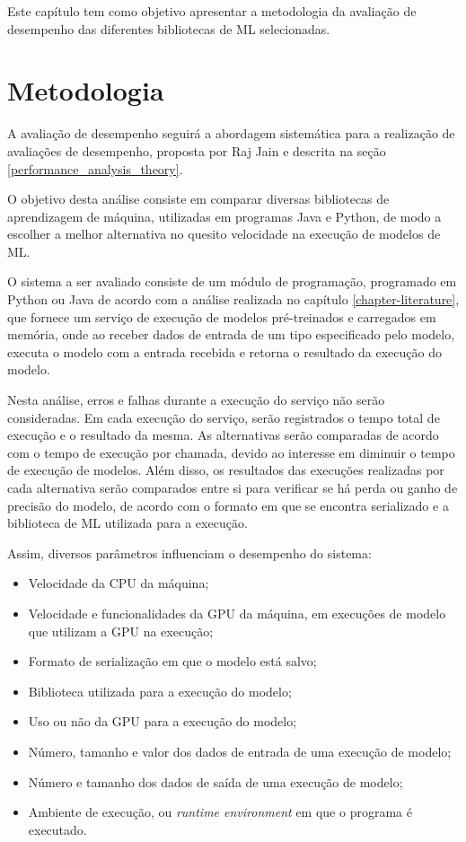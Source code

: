 Este capítulo tem como objetivo apresentar a metodologia da avaliação de desempenho das diferentes bibliotecas de ML selecionadas.

\section{Metodologia}

A avaliação de desempenho seguirá a abordagem sistemática para a realização de avaliações de desempenho, proposta por Raj Jain e descrita na seção \ref{performance_analysis_theory}.

O objetivo desta análise consiste em comparar diversas bibliotecas de aprendizagem de máquina, utilizadas em programas Java e Python, de modo a escolher a melhor alternativa no quesito velocidade na execução de modelos de ML.

O sistema a ser avaliado consiste de um módulo de programação, programado em Python ou Java de acordo com a análise realizada no capítulo \ref{chapter-literature}, que fornece um serviço de execução de modelos pré-treinados e carregados em memória, onde ao receber dados de entrada de um tipo especificado pelo modelo, executa o modelo com a entrada recebida e retorna o resultado da execução do modelo.

Nesta análise, erros e falhas durante a execução do serviço não serão consideradas. Em cada execução do serviço, serão registrados o tempo total de execução e o resultado da mesma. As alternativas serão comparadas de acordo com o tempo de execução por chamada, devido ao interesse em diminuir o tempo de execução de modelos. Além disso, os resultados das execuções realizadas por cada alternativa serão comparados entre si para verificar se há perda ou ganho de precisão do modelo, de acordo com o formato em que se encontra serializado e a biblioteca de ML utilizada para a execução.

Assim, diversos parâmetros influenciam o desempenho do sistema:

\begin{itemize}
  \item Velocidade da CPU da máquina;
  \item Velocidade e funcionalidades da GPU da máquina, em execuções de modelo que utilizam a GPU na execução;
  \item Formato de serialização em que o modelo está salvo;
  \item Biblioteca utilizada para a execução do modelo;
  \item Uso ou não da GPU para a execução do modelo;
  \item Número, tamanho e valor dos dados de entrada de uma execução de modelo;
  \item Número e tamanho dos dados de saída de uma execução de modelo;
  \item Ambiente de execução, ou \textit{runtime environment} em que o programa é executado.
\end{itemize}

